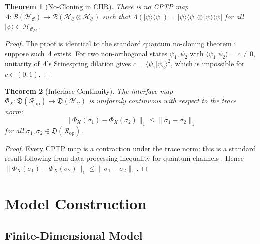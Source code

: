 \documentclass[twocolumn,aps,prd,superscriptaddress,nofootinbib]{revtex4-2}
\newtheorem{theorem}{Theorem}[section]
\newcommand{\HC}{\mathcal{H}_{\mathcal{C}}}
\newcommand{\CR}{\mathcal{R}}
\newcommand{\CM}{\mathcal{M}}
\newcommand{\CB}{\mathcal{B}}
\newcommand{\ket}[1]{|#1\rangle}
\newcommand{\bra}[1]{\langle #1|}
\begin{document}
\begin{theorem}[No-Cloning in CIIR]
\label{thm:nocloning}
There is no CPTP map $\Lambda : \CB(\HC) \to \CB(\HC\otimes\HC)$ such that
$\Lambda(\ket\psi\bra\psi) = \ket\psi\bra\psi \otimes \ket\psi\bra\psi$
for all $\ket\psi \in \HC_\CM$.
\end{theorem}

\begin{proof}
The proof is identical to the standard quantum no-cloning theorem
\cite{Wootters1982}: suppose such $\Lambda$ exists.  For two
non-orthogonal states $\psi_1,\psi_2$ with $\langle\psi_1|\psi_2\rangle = c \neq 0$,
unitarity of $\Lambda$'s Stinespring dilation gives
$c = \langle\psi_1|\psi_2\rangle^2$, which is impossible for $c \in (0,1)$.
\end{proof}

\begin{theorem}[Interface Continuity]
\label{thm:continuity}
The interface map $\Phi_X : \mathfrak{D}(\CR_\mathrm{op}) \to \mathfrak{D}(\HC)$
is uniformly continuous with respect to the trace norm:
\begin{equation}
  \|\Phi_X(\sigma_1) - \Phi_X(\sigma_2)\|_1
    \leq \|\sigma_1 - \sigma_2\|_1
  \label{eq:continuity}
\end{equation}
for all $\sigma_1, \sigma_2 \in \mathfrak{D}(\CR_\mathrm{op})$.
\end{theorem}

\begin{proof}
Every CPTP map is a contraction under the trace norm: this is a standard
result following from data processing inequality for quantum channels
\cite{Lindblad1975}.  Hence $\|\Phi_X(\sigma_1)-\Phi_X(\sigma_2)\|_1
\leq \|\sigma_1-\sigma_2\|_1$.
\end{proof}

\section{Model Construction}
\label{sec:models}

\subsection{Finite-Dimensional Model}
\label{subsec:finitedim}
\end{document}
